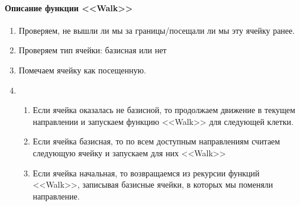 \documentclass{article}
\begin{document}
\paragraph{Описание функции <<Walk>>}
\begin{enumerate}
    \item Проверяем, не вышли ли мы за границы/посещали ли мы эту ячейку ранее. 
    \item Проверяем тип ячейки: базисная или нет
    \item Помечаем ячейку как посещенную.
    \item 
    \begin{enumerate}
        \item Если ячейка оказалась не базисной, то продолжаем движение в текущем направлении и запускаем функцию <<Walk>> для следующей клетки.
        \item Если ячейка базисная, то по всем доступным направлениям считаем следующую ячейку и запускаем для них <<Walk>>
        \item Если ячейка начальная, то возвращаемся из рекурсии функций <<Walk>>, записывая базисные ячейки, в которых мы поменяли направление.
    \end{enumerate}
\end{enumerate}
\end{document}
